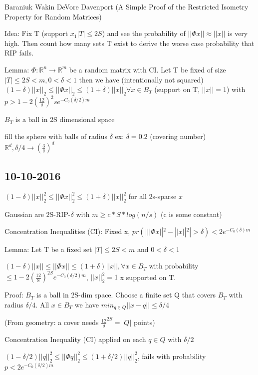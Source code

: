 \documentclass[12pt,letterpaper]{report}
\begin{document}
Baraniuk Wakin DeVore Davenport (A Simple Proof of the Restricted Isometry Property for Random Matrices) 

Idea:  Fix T (support $x_1 |T| \leq 2S$) and see the probability of $||\Phi x|| \approx ||x||$ is very high.  Then count how many sets T exist to derive the worse case probability that RIP fails.

Lemma: $\Phi : \mathbb{R}^n \rightarrow \mathbb{R}^m$ be a random matrix with CI.  Let T be fixed of size $|T| \leq 2S < m, 0 < \delta < 1$ then we have (intentionally not squared) $(1-\delta)||x||_2 \leq ||\Phi x||_2 \leq (1+\delta)||x||_2 \forall x \in B_T$ (support on T, $||x|| =1$) with $p >  1 - 2(\frac{12}{\delta})^2s e^{-C_0(\delta/2)m}$

$B_T$ is a ball in 2S dimensional space

fill the sphere with balls of radius $\delta$ ex: $\delta = 0.2$ (covering number) $\mathbb{R}^d, \delta/4 \rightarrow (\frac{3}{\delta})^d$

\subsection*{10-10-2016}

$(1-\delta)||x||_2^2 \leq ||\Phi x||_2^2 \leq (1+\delta)||x||_2^2$ for all 2s-sparse $x$

Gaussian are 2S-RIP-$\delta$ with $m \geq c*S*log(n/s)$ (c is some constant)

Concentration Inequalities (CI): Fixed x, $pr(| ||\Phi x||^2 - ||x||^2| > \delta) < 2 e^{-C_0(\delta)m}$

Lemma: Let T be a fixed set $|T| \leq 2S < m$ and $0 < \delta < 1$

$(1-\delta)||x|| \leq ||\Phi x|| \leq (1+\delta)||x||, \forall x \in B_T$ with probability $\leq 1 - 2(\frac{12}{8})^{2S}e^{-C_0(\delta/2)m}$, $||x||_2^2 = 1$ x supported on T.

Proof: $B_T$ is a ball in 2S-dim space.  Choose a finite set Q that covers $B_T$ with radius $\delta/4$.  All $x \in B_T$ we have $min_{q \in Q} ||x - q|| \leq \delta/4$

(From geometry: a cover needs $\frac{12}{\delta}^{2S} = |Q|$ points)

Concentration Inequality (CI) applied on each $q \in Q$ with $\delta/2$

$(1-\delta/2)||q||_2^2 \leq ||\Phi q||_2^2 \leq (1+\delta/2)||q||_2^2$, fails with probability $p < 2 e^{-C_0(\delta/2)m}$
\end{document}
